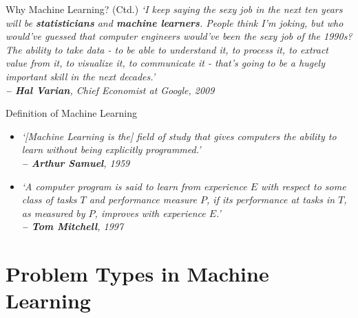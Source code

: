 \begin{frame}{Why Machine Learning? (Ctd.)}{}
	\textit{`I keep saying the sexy job in the next ten years will be \textbf{statisticians} and \textbf{machine learners}.
		People think I’m joking, but who would’ve guessed that computer engineers would’ve been the sexy job of the
		1990s? The ability to take data - to be able to understand it, to process it, to extract value from it, to visualize it,
		to communicate it - that’s going to be a hugely important skill in the next decades.' \\
		\hfill\textbf{-- Hal Varian}, Chief Economist at Google, 2009}
\end{frame}


\begin{frame}{Definition of Machine Learning}{}
	\begin{itemize}
		\item \textit{`[Machine Learning is the] field of study that gives computers the ability
			to learn without being explicitly programmed.' \\
			\hfill\textbf{-- Arthur Samuel}, 1959}
		\vspace*{5mm}
		\item \textit{`A computer program is said to learn from experience $E$ with respect to some class of 
			tasks $T$ and performance measure $P$, if its performance at tasks in $T$, as measured by $P$, improves with
			experience $E$.' \\
			\hfill\textbf{-- Tom Mitchell}, 1997}
	\end{itemize}
\end{frame}



\section{Problem Types in Machine Learning}

\begin{frame}{}{}

\end{frame}

\subsection{}


